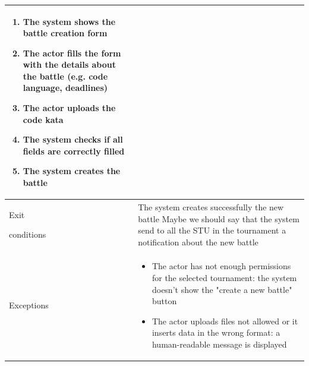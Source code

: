 \begin{center}
\begin{tabular}{| m{2cm} | m{10cm}|}
\begin{enumerate}
                                    \item The system shows the battle creation form
                                    \item The actor fills the form with the details about the battle (e.g. code language, deadlines)
                                    \item The actor uploads the code kata
                                    \item The system checks if all fields are correctly filled
                                    \item The system creates the battle
                                \end{enumerate}                             \\ \hline
        Exit \par conditions  & The system creates successfully the new battle    {\color{red} Maybe we should say that the system send to all the STU in the tournament a notification about the new battle}                                                                              \\ \hline
        Exceptions            & \begin{itemize}
                                    \item The actor has not enough permissions for the selected tournament: the system doesn't show the "create a new battle" button
                                    \item The actor uploads files not allowed or it inserts data in the wrong format: a human-readable message is displayed
                                \end{itemize} \\ \hline
    \end{tabular}
\end{center}

